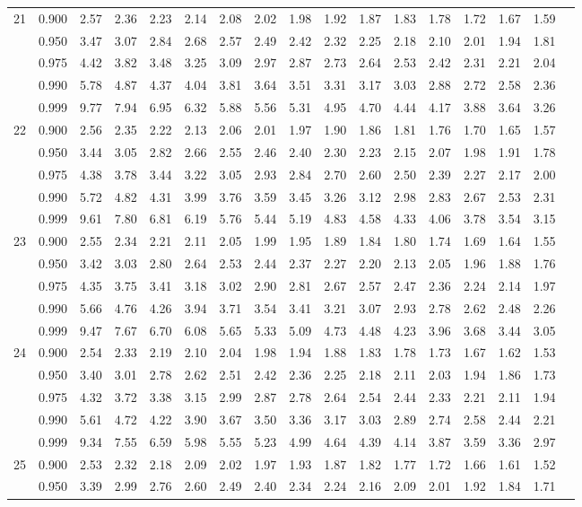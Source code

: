 {\begin{center}
\begin{tabular}{rrr@{\,}r@{\,}r@{\,}r@{\,}r@{\,}r@{\,}r@{\,}r
                   @{\,}r@{\,}r@{\,}r@{\,}r@{\,}r@{\,}r@{\,}r}
21&0.900&2.57&2.36&2.23&2.14&2.08&2.02&1.98&1.92&1.87&1.83&1.78&1.72&1.67&1.59\\
  &0.950&3.47&3.07&2.84&2.68&2.57&2.49&2.42&2.32&2.25&2.18&2.10&2.01&1.94&1.81\\
  &0.975&4.42&3.82&3.48&3.25&3.09&2.97&2.87&2.73&2.64&2.53&2.42&2.31&2.21&2.04\\
  &0.990&5.78&4.87&4.37&4.04&3.81&3.64&3.51&3.31&3.17&3.03&2.88&2.72&2.58&2.36\\
  &0.999&9.77&7.94&6.95&6.32&5.88&5.56&5.31&4.95&4.70&4.44&4.17&3.88&3.64&3.26\\
22&0.900&2.56&2.35&2.22&2.13&2.06&2.01&1.97&1.90&1.86&1.81&1.76&1.70&1.65&1.57\\
  &0.950&3.44&3.05&2.82&2.66&2.55&2.46&2.40&2.30&2.23&2.15&2.07&1.98&1.91&1.78\\
  &0.975&4.38&3.78&3.44&3.22&3.05&2.93&2.84&2.70&2.60&2.50&2.39&2.27&2.17&2.00\\
  &0.990&5.72&4.82&4.31&3.99&3.76&3.59&3.45&3.26&3.12&2.98&2.83&2.67&2.53&2.31\\
  &0.999&9.61&7.80&6.81&6.19&5.76&5.44&5.19&4.83&4.58&4.33&4.06&3.78&3.54&3.15\\
23&0.900&2.55&2.34&2.21&2.11&2.05&1.99&1.95&1.89&1.84&1.80&1.74&1.69&1.64&1.55\\
  &0.950&3.42&3.03&2.80&2.64&2.53&2.44&2.37&2.27&2.20&2.13&2.05&1.96&1.88&1.76\\
  &0.975&4.35&3.75&3.41&3.18&3.02&2.90&2.81&2.67&2.57&2.47&2.36&2.24&2.14&1.97\\
  &0.990&5.66&4.76&4.26&3.94&3.71&3.54&3.41&3.21&3.07&2.93&2.78&2.62&2.48&2.26\\
  &0.999&9.47&7.67&6.70&6.08&5.65&5.33&5.09&4.73&4.48&4.23&3.96&3.68&3.44&3.05\\
24&0.900&2.54&2.33&2.19&2.10&2.04&1.98&1.94&1.88&1.83&1.78&1.73&1.67&1.62&1.53\\
  &0.950&3.40&3.01&2.78&2.62&2.51&2.42&2.36&2.25&2.18&2.11&2.03&1.94&1.86&1.73\\
  &0.975&4.32&3.72&3.38&3.15&2.99&2.87&2.78&2.64&2.54&2.44&2.33&2.21&2.11&1.94\\
  &0.990&5.61&4.72&4.22&3.90&3.67&3.50&3.36&3.17&3.03&2.89&2.74&2.58&2.44&2.21\\
  &0.999&9.34&7.55&6.59&5.98&5.55&5.23&4.99&4.64&4.39&4.14&3.87&3.59&3.36&2.97\\
25&0.900&2.53&2.32&2.18&2.09&2.02&1.97&1.93&1.87&1.82&1.77&1.72&1.66&1.61&1.52\\
  &0.950&3.39&2.99&2.76&2.60&2.49&2.40&2.34&2.24&2.16&2.09&2.01&1.92&1.84&1.71\\

\end{tabular}
\end{center}}
